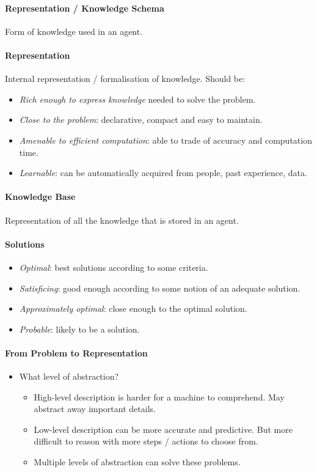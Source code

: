\documentclass[twocolumn,english]{article}
\begin{document}
\paragraph{Representation / Knowledge Schema}

Form of knowledge used in an agent.

\paragraph{Representation}

Internal representation / formalisation of knowledge. Should be:
\begin{itemize}
\item \emph{Rich enough to express knowledge} needed to solve the problem.
\item \emph{Close to the problem}: declarative, compact and easy to maintain.
\item \emph{Amenable to efficient computation}: able to trade of accuracy
and computation time.
\item \emph{Learnable}: can be automatically acquired from people, past
experience, data.
\end{itemize}

\paragraph{Knowledge Base}

Representation of all the knowledge that is stored in an agent.

\paragraph{Solutions}
\begin{itemize}
\item \emph{Optimal}: best solutions according to some criteria.
\item \emph{Satisficing}: good enough according to some notion of an adequate
solution.
\item \emph{Approximately optimal}: close enough to the optimal solution.
\item \emph{Probable}: likely to be a solution.
\end{itemize}

\paragraph{From Problem to Representation}
\begin{itemize}
\item What level of abstraction?
\begin{itemize}
\item High-level description is harder for a machine to comprehend. May
abstract away important details.
\item Low-level description can be more accurate and predictive. But more
difficult to reason with \textemdash{} more steps / actions to choose
from.
\item Multiple levels of abstraction can solve these problems.
\end{itemize}
\end{itemize}
\end{document}
